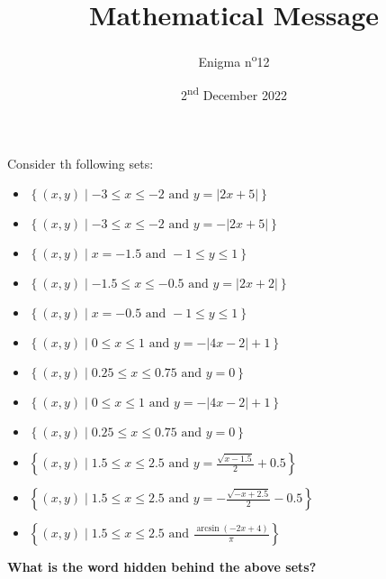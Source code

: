 \documentclass[a4paper, top=10mm]{article}
\title{\textbf{\huge{Mathematical Message}}}
\author{Enigma n\textsuperscript{o}12}
\date{2\textsuperscript{nd} December 2022}
\begin{document}
	\maketitle
	
	Consider th following sets:
	\begin{itemize}
		\item $\left\lbrace (x,y) \mid -3 \leq x \leq -2 \text{ and } y=|2x+5| \right\rbrace$
		\item $\left\lbrace (x,y) \mid -3 \leq x \leq -2 \text{ and } y=-|2x+5| \right\rbrace$
		\item $\left\lbrace (x,y) \mid x=-1.5 \text{ and } -1 \leq y \leq 1 \right\rbrace$
		\item $\left\lbrace (x,y) \mid -1.5 \leq x \leq -0.5 \text{ and } y=|2x+2| \right\rbrace$
		\item $\left\lbrace (x,y) \mid x=-0.5 \text{ and } -1 \leq y \leq 1 \right\rbrace$
		\item $\left\lbrace (x,y) \mid 0 \leq x \leq 1 \text{ and } y=-|4x-2| + 1 \right\rbrace$
		\item $\left\lbrace (x,y) \mid 0.25 \leq x \leq 0.75 \text{ and } y=0 \right\rbrace$
		\item $\left\lbrace (x,y) \mid 0 \leq x \leq 1 \text{ and } y=-|4x-2| + 1 \right\rbrace$
		\item $\left\lbrace (x,y) \mid 0.25 \leq x \leq 0.75 \text{ and } y=0 \right\rbrace$
		\item $\left\lbrace (x,y) \mid 1.5 \leq x \leq 2.5 \text{ and } y=\frac{\sqrt{x-1.5}}{2} + 0.5 \right\rbrace$
		\item $\left\lbrace (x,y) \mid 1.5 \leq x \leq 2.5 \text{ and } y=-\frac{\sqrt{-x+2.5}}{2} - 0.5 \right\rbrace$
		\item $\left\lbrace (x,y) \mid 1.5 \leq x \leq 2.5 \text{ and } \frac{\arcsin{(-2x+4)}}{\pi} \right\rbrace$
	\end{itemize}

	\vspace{1cm}
	
	\textbf{What is the word hidden behind the above sets?}
	
\end{document}
